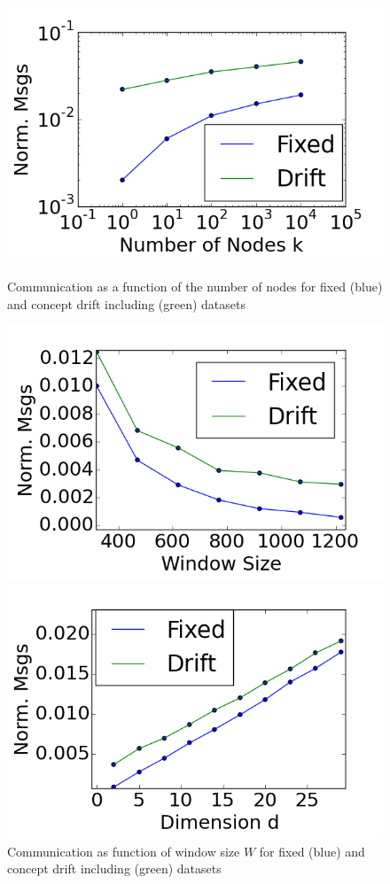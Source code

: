 \begin{figure}[!htb]
    \centering
  \includegraphics[width=\linewidth]{CommunicationOfFixedVsDrift/Nodes.png}
  \caption{Communication as a function of the number of nodes for fixed (blue) and concept drift including (green) datasets}\label{Nodes}
\endminipage\hfill
{}
    \centering
  \includegraphics[width=\linewidth]{CommunicationOfFixedVsDrift/WindowSize.png}
  \caption{Communication as function of window size $W$ for fixed (blue) and concept drift including (green) datasets}\label{WindowSize}
\endminipage\hfill
{}
    \centering
  \includegraphics[width=\linewidth]{CommunicationOfFixedVsDrift/Dimension.png}

\end{figure}
